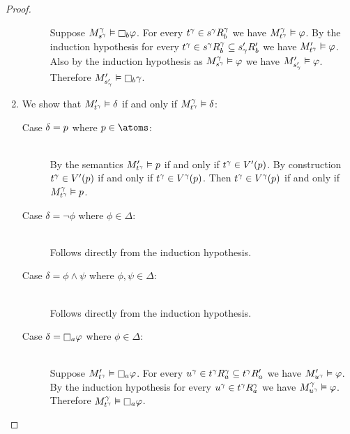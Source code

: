 \begin{proof}
\begin{enumerate}
\begin{description}
                Suppose $\kPModel[\gamma]{\kStateS[\gamma]} \entails \necessaryB \phi$.
                For every $\kStateT[\gamma] \in \kSuccessorsB[\gamma]{\kStateS[\gamma]}$ we have $\kPModel[\gamma]{\kStateT[\gamma]} \entails \phi$.
                By the induction hypothesis for every $\kStateT[\gamma] \in \kSuccessorsB[\gamma]{\kStateS[\gamma]} \subseteq \kSuccessorsPB{\kStateSP_\gamma}$ we have $\kPModelP{\kStateT[\gamma]} \entails \phi$.
                Also by the induction hypothesis as $\kPModel[\gamma]{\kStateS[\gamma]} \entails \phi$ we have $\kPModelP{\kStateSP_\gamma} \entails \phi$.
                Therefore $\kPModelP{\kStateSP_\gamma} \entails \necessaryB \gamma$.
        \end{description}
    \item
        We show that $\kPModelP{\kStateT[\gamma]} \entails \delta$ if and only if $\kPModel[\gamma]{\kStateT[\gamma]} \entails \delta$:
        \begin{description}
            \item[Case $\delta = \atomP$ where $\atomP \in \atoms$:]
                \hfill\\
                By the semantics $\kPModelP{\kStateT[\gamma]} \entails \atomP$ if and only if $\kStateT[\gamma] \in \kValuationP(\atomP)$.
                By construction $\kStateT[\gamma] \in \kValuationP(\atomP)$ if and only if $\kStateT[\gamma] \in \kValuation[\gamma](\atomP)$.
                Then $\kStateT[\gamma] \in \kValuation[\gamma](\atomP)$ if and only if $\kPModel[\gamma]{\kStateT[\gamma]} \entails \atomP$.
            \item[Case $\delta = \lnot \phi$ where $\phi \in \Delta$:]
                \hfill\\
                Follows directly from the induction hypothesis.
            \item[Case $\delta = \phi \land \psi$ where $\phi, \psi \in \Delta$:]
                \hfill\\
                Follows directly from the induction hypothesis.
            \item[Case $\delta = \necessaryA \phi$ where $\phi \in \Delta$:]
                \hfill\\
                Suppose $\kPModelP{\kStateT[\gamma]} \entails \necessaryA \phi$.
                For every $\kStateU[\gamma] \in \kSuccessorsA[\gamma]{\kStateT[\gamma]} \subseteq \kSuccessorsPA{\kStateT[\gamma]}$ we have $\kPModelP{\kStateU[\gamma]} \entails \phi$.
                By the induction hypothesis for every $\kStateU[\gamma] \in \kSuccessorsA[\gamma]{\kStateT[\gamma]}$ we have $\kPModel[\gamma]{\kStateU[\gamma]} \entails \phi$.
                Therefore $\kPModel[\gamma]{\kStateT[\gamma]} \entails \necessaryA \phi$.


\end{description}
\end{enumerate}
\end{proof}
